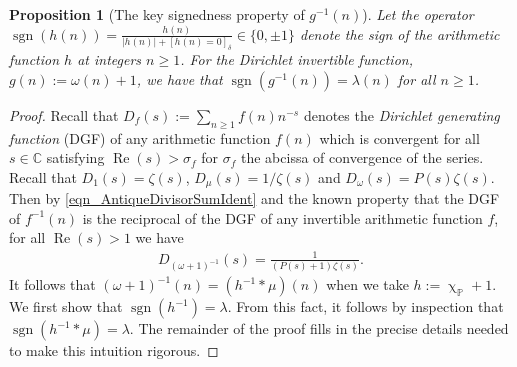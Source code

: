\documentclass[11pt,reqno,a4letter]{article}
\numberwithin{figure}{section}
\numberwithin{table}{section}
\newcommand{\Iverson}[1]{\ensuremath{\left[#1\right]_{\delta}}}
\renewcommand{\chi}{\upchi}
\theoremstyle{plain}
\newtheorem{prop}[theorem]{Proposition}
\numberwithin{theorem}{section}
\theoremstyle{definition}
\newcommand{\NBRef}[1]{}
\renewcommand{\Re}{\operatorname{Re}}
\begin{document}
\begin{prop}[The key signedness property of $g^{-1}(n)$]
\label{prop_SignageDirInvsOfPosBddArithmeticFuncs_v1} 
Let the operator 
$\operatorname{sgn}(h(n)) = \frac{h(n)}{|h(n)| + \Iverson{h(n) = 0}} \in \{0, \pm 1\}$ denote the sign 
of the arithmetic function $h$ at integers $n \geq 1$. 
For the Dirichlet invertible function, $g(n) := \omega(n) + 1$, 
we have that $\operatorname{sgn}(g^{-1}(n)) = \lambda(n)$ for all $n \geq 1$. 
\NBRef{A02-2020-04-26}
\end{prop} 
\begin{proof} 
Recall that $D_f(s) := \sum_{n \geq 1} f(n) n^{-s}$ denotes the 
\emph{Dirichlet generating function} (DGF) of any 
arithmetic function $f(n)$ which is convergent for all $s \in \mathbb{C}$ satisfying 
$\Re(s) > \sigma_f$ for $\sigma_f$ the abcissa of convergence of the series. 
Recall that $D_1(s) = \zeta(s)$, $D_{\mu}(s) = 1 / \zeta(s)$ and $D_{\omega}(s) = P(s) \zeta(s)$. 
Then by \eqref{eqn_AntiqueDivisorSumIdent} and the known property that the DGF of $f^{-1}(n)$ is 
the reciprocal of the DGF of any invertible arithmetic function $f$, for all $\Re(s) > 1$ we have 
\begin{align} 
\label{eqn_DGF_of_gInvn} 
D_{(\omega+1)^{-1}}(s) = \frac{1}{(P(s)+1) \zeta(s)}. 
\end{align} 
It follows that $(\omega + 1)^{-1}(n) = (h^{-1} \ast \mu)(n)$ when we take 
$h := \chi_{\mathbb{P}} + 1$. 
We first show that $\operatorname{sgn}(h^{-1}) = \lambda$. From this fact, it follows by inspection 
that $\operatorname{sgn}(h^{-1} \ast \mu) = \lambda$. The remainder of the proof fills in the 
precise details needed to make this intuition rigorous. 


\end{proof}
\end{document}
